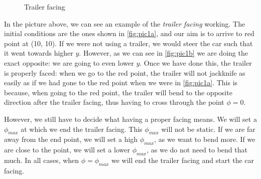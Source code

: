 \begin{figure}[H] 
    \centering
    \hspace{0.5cm}%
    \caption{Trailer facing}
\end{figure}

In the picture above, we can see an example of the \emph{trailer facing} working. The initial conditions are the ones shown in \ref{fig:pic1a}, and our aim is to arrive to red point at (10, 10). If we were not using a trailer, we would steer the car such that it went towards higher $y$. However, as we can see in \ref{fig:pic1b} we are doing the exact opposite: we are going to even lower $y$. Once we have done this, the trailer is properly faced: when we go to the red point, the trailer will not jackknife as easily as if we had gone to the red point when we were in \ref{fig:pic1a}. This is because, when going to the red point, the trailer will bend to the opposite direction after the trailer facing, thus having to cross through the point $\phi = 0$.

However, we still have to decide what having a proper facing means. We will set a $\phi_{max}$ at which we end the trailer facing. This $\phi_{max}$ will not be static. If we are far away from the end point, we will set a high $\phi_{max}$, as we want to bend more. If we are close to the point, we will set a lower $\phi_{max}$, as we do not need to bend that much. In all cases, when $\phi = \phi_{max}$ we will end the trailer facing and start the car facing.\\


